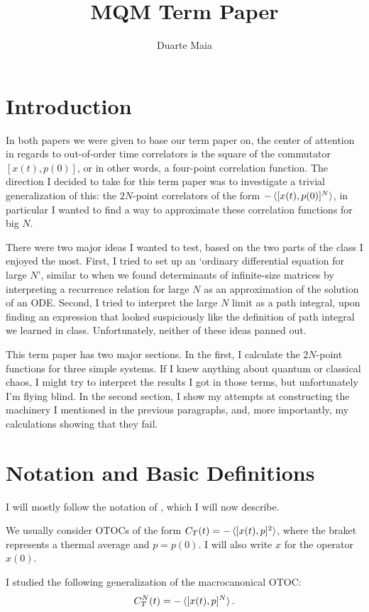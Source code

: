 \documentclass{article}
\title{MQM Term Paper}
\author{Duarte Maia}
\date{}
\begin{document}
\tableofcontents

\section{Introduction}

In both papers we were given to base our term paper on, the center of attention in regards to out-of-order time correlators is the square of the commutator $[x(t), p(0)]$, or in other words, a four-point correlation function. The direction I decided to take for this term paper was to investigate a trivial generalization of this: the $2N$-point correlators of the form $-\braket{[x(t),p(0)]^N}$, in particular I wanted to find a way to approximate these correlation functions for big $N$.

There were two major ideas I wanted to test, based on the two parts of the class I enjoyed the most. First, I tried to set up an `ordinary differential equation for large $N$', similar to when we found determinants of infinite-size matrices by interpreting a recurrence relation for large $N$ as an approximation of the solution of an ODE. Second, I tried to interpret the large $N$ limit as a path integral, upon finding an expression that looked suspiciously like the definition of path integral we learned in class. Unfortunately, neither of these ideas panned out.

This term paper has two major sections. In the first, I calculate the $2N$-point functions for three simple systems. If I knew anything about quantum or classical chaos, I might try to interpret the results I got in those terms, but unfortunately I'm flying blind. In the second section, I show my attempts at constructing the machinery I mentioned in the previous paragraphs, and, more importantly, my calculations showing that they fail.

\section{Notation and Basic Definitions}

I will mostly follow the notation of \cite{Hashimoto_2017}, which I will now describe.

We usually consider OTOCs of the form $C_T(t) = -\braket{[x(t), p]^2}$, where the braket represents a thermal average and $p = p(0)$. I will also write $x$ for the operator $x(0)$.

I studied the following generalization of the macrocanonical OTOC:
\begin{equation}
C_T^N(t) = -\braket{[x(t),p]^N}.
\end{equation}
\end{document}
